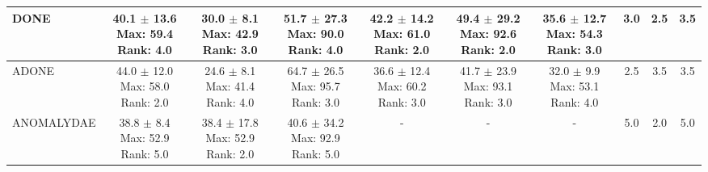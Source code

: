 \begin{longtable}{|l|c|c|c|c|c|c|c|c|c|}
DONE & \makecell{ 40.1 $\pm$ 13.6 \\ \scriptsize Max: 59.4 \\ \scriptsize Rank: 4.0 } & \makecell{ 30.0 $\pm$ 8.1 \\ \scriptsize Max: 42.9 \\ \scriptsize Rank: 3.0 } & \makecell{ 51.7 $\pm$ 27.3 \\ \scriptsize Max: 90.0 \\ \scriptsize Rank: 4.0 } & \makecell{ 42.2 $\pm$ 14.2 \\ \scriptsize Max: 61.0 \\ \scriptsize Rank: 2.0 } & \makecell{ 49.4 $\pm$ 29.2 \\ \scriptsize Max: 92.6 \\ \scriptsize Rank: 2.0 } & \makecell{ 35.6 $\pm$ 12.7 \\ \scriptsize Max: 54.3 \\ \scriptsize Rank: 3.0 } & 3.0 & 2.5 & 3.5 \\ \hline 
ADONE & \makecell{ 44.0 $\pm$ 12.0 \\ \scriptsize Max: 58.0 \\ \scriptsize Rank: 2.0 } & \makecell{ 24.6 $\pm$ 8.1 \\ \scriptsize Max: 41.4 \\ \scriptsize Rank: 4.0 } & \makecell{ 64.7 $\pm$ 26.5 \\ \scriptsize Max: 95.7 \\ \scriptsize Rank: 3.0 } & \makecell{ 36.6 $\pm$ 12.4 \\ \scriptsize Max: 60.2 \\ \scriptsize Rank: 3.0 } & \makecell{ 41.7 $\pm$ 23.9 \\ \scriptsize Max: 93.1 \\ \scriptsize Rank: 3.0 } & \makecell{ 32.0 $\pm$ 9.9 \\ \scriptsize Max: 53.1 \\ \scriptsize Rank: 4.0 } & 2.5 & 3.5 & 3.5 \\ \hline 
ANOMALYDAE & \makecell{ 38.8 $\pm$ 8.4 \\ \scriptsize Max: 52.9 \\ \scriptsize Rank: 5.0 } & \makecell{ 38.4 $\pm$ 17.8 \\ \scriptsize Max: 52.9 \\ \scriptsize Rank: 2.0 } & \makecell{ 40.6 $\pm$ 34.2 \\ \scriptsize Max: 92.9 \\ \scriptsize Rank: 5.0 } & - & - & - & 5.0 & 2.0 & 5.0 \\ \hline 

\end{longtable}
